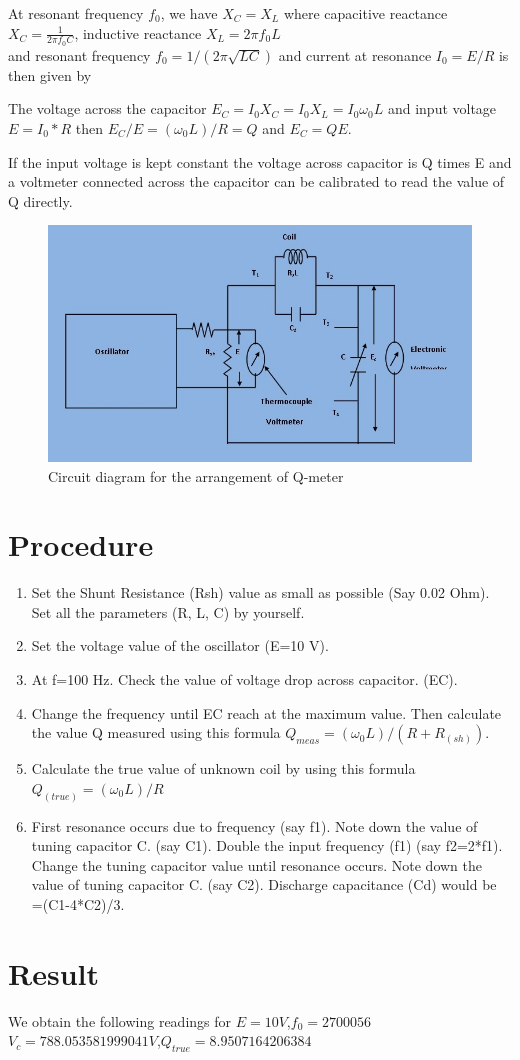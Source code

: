 \documentclass[12pt]{article}
\begin{document}
	At resonant frequency $ f_0 $, we have $X_C = X_L$ where capacitive reactance $X_C = \frac{1}{2 \pi f_0 C}$, inductive reactance $X_L = 2 \pi f_0 L $ \\[2mm] and resonant frequency $f_0 = 1/(2 \pi \sqrt{LC})$ and current at resonance $I_0 = E/R$ is then given by
	
	The voltage across the capacitor $E_C=I_0 X_C=I_0X_L=I_0\omega_0L$ and input voltage $E=I_0*R$
then $E_C/E=(\omega_0 L)/R=Q$ and $E_C=QE$.
	
	If the input voltage is kept constant the voltage across capacitor is Q times E and a voltmeter connected across the capacitor can be calibrated to read the value of Q directly.

	\begin{figure}[H]
		\centering
		\includegraphics[scale= 0.7]{circuit.jpg}
		\caption{Circuit diagram for the arrangement of Q-meter}
	\end{figure} 

	\section{Procedure}
	\begin{enumerate}
		\item Set the Shunt Resistance (Rsh) value as small as possible (Say 0.02 Ohm). Set all the parameters (R, L, C) by yourself.
		\item Set the voltage value of the oscillator (E=10 V).
		\item At f=100 Hz. Check the value of voltage drop across capacitor. (EC).
		\item Change the frequency until EC reach at the maximum value. Then calculate the value Q measured using this formula $Q_{meas}=(\omega_0 L)/(R+ R_(sh))$.
		\item Calculate the true value of unknown coil by using this formula $Q_(true)=(\omega_0L)/R$
		\item First resonance occurs due to frequency (say f1). Note down the value of tuning capacitor C. (say C1). Double the input frequency (f1) (say f2=2*f1). Change the tuning capacitor value until resonance occurs. Note down the value of tuning capacitor C. (say C2). Discharge capacitance (Cd) would be =(C1-4*C2)/3. 
	\end{enumerate}
	\section{Result }
	We obtain the following readings for $ E=10V $,$ f_0 = 2700056 $ \\
	$ V_c=788.053581999041V $,$ Q_{true} = 8.9507164206384  $
\end{document}
